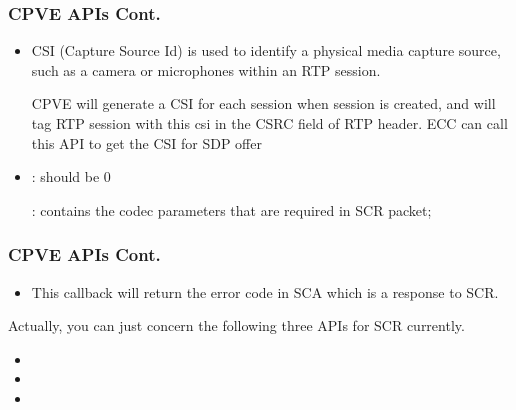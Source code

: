 \documentclass{beamer}
\begin{document}
\begin{frame}
  \frametitle{CPVE APIs Cont.}
  {\small
  \begin{itemize}
    \setlength\itemsep{1em}
    \item {}

      {\footnotesize
      CSI (Capture Source Id) is used to identify a physical media capture source, such as a camera or microphones within an RTP session. 
      
      CPVE will generate a CSI for each session when session is created, and will tag RTP session with this csi in the CSRC field of RTP header. 
      ECC can call this API to get the CSI for SDP offer 
      } 

    \item {}

      : should be 0

      : contains the codec parameters that are required in SCR packet;
  \end{itemize}
}
\end{frame}

\begin{frame}
  \frametitle{CPVE APIs Cont.}
  {\small
  \begin{itemize}
    \setlength\itemsep{1em}
    \item  {}

      This callback will return the error code in SCA which is a response to SCR. 

  \end{itemize}
}
{\small
  Actually, you can just concern the following three APIs for SCR currently.
  \begin{itemize}
      \item {}
      \item {}
      \item {}
    \end{itemize}
}
\end{frame}
\end{document}
